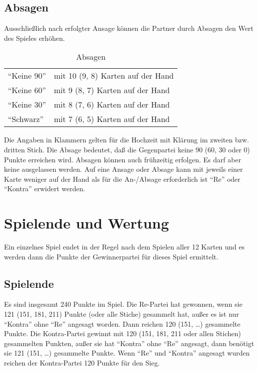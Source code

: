 \documentclass[12pt]{scrartcl}
\begin{document}
\subsection{Absagen}
Ausschließlich nach erfolgter Ansage können die Partner durch Absagen den Wert des Spieles erhöhen.
\begin{table}[htbp]
  \centering
  \begin{tabular}{ll}
    "`Keine 90"' & mit 10 (9, 8) Karten auf der Hand\\
    "`Keine 60"' & mit 9 (8, 7) Karten auf der Hand\\
    "`Keine 30"' & mit 8 (7, 6) Karten auf der Hand\\
    "`Schwarz"' & mit 7 (6, 5) Karten auf der Hand
  \end{tabular}
  \caption{Absagen}
\end{table}
Die Angaben in Klammern gelten für die Hochzeit mit Klärung im zweiten bzw. dritten Stich. Die Absage bedeutet, daß die Gegenpartei keine 90 (60, 30 oder 0) Punkte erreichen wird. Absagen können auch frühzeitig erfolgen. Es darf aber keine ausgelassen werden. Auf eine Ansage oder Absage kann mit jeweils einer Karte weniger auf der Hand als für die An-/Absage erforderlich ist "`Re"' oder "`Kontra"' erwidert werden.

\section{Spielende und Wertung}
Ein einzelnes Spiel endet in der Regel nach dem Spielen aller 12 Karten und es werden dann die Punkte der Gewinnerpartei für dieses Spiel ermittelt.

\subsection{Spielende}
Es sind insgesamt 240 Punkte im Spiel. Die Re-Partei hat gewonnen, wenn sie 121 (151, 181, 211) Punkte (oder alle Stiche) gesammelt hat, außer es ist nur "`Kontra"' ohne "`Re"' angesagt worden. Dann reichen 120 (151, \dots) gesammelte Punkte. Die Kontra-Partei gewinnt mit 120 (151, 181, 211 oder allen Stichen) gesammelten Punkten, außer sie hat "`Kontra"' ohne "`Re"' angesagt, dann benötigt sie 121 (151, \dots) gesammelte Punkte. Wenn "`Re"' und "`Kontra"' angesagt wurden reichen der Kontra-Partei 120 Punkte für den Sieg.
\end{document}
